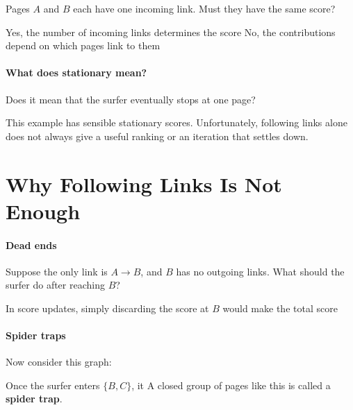 \documentclass[11pt]{article}
\begin{document}
\begin{Qu}
    Pages $A$ and $B$ each have one incoming link. Must they have the same score?
    \begin{itemize}
        \aitem Yes, the number of incoming links determines the score
        \bitem No, the contributions depend on which pages link to them
    \end{itemize}
\end{Qu}

\paragraph{What does stationary mean?}
Does it mean that the surfer eventually stops at one page?
\vs{.8cm}

\vfill
This example has sensible stationary scores. Unfortunately, following links
alone does not always give a useful ranking or an iteration that settles down.

\newpage
\section{Why Following Links Is Not Enough}
\paragraph{Dead ends}
Suppose the only link is $A\to B$, and $B$ has no outgoing links. What should
the surfer do after reaching $B$?
\vs{.8cm}

In score updates, simply discarding the score at $B$ would make the total
score 

\paragraph{Spider traps}
Now consider this graph:
\begin{center}
\end{center}
Once the surfer enters $\{B,C\}$, it  A closed group of
pages like this is called a \textbf{spider trap}.
\end{document}
